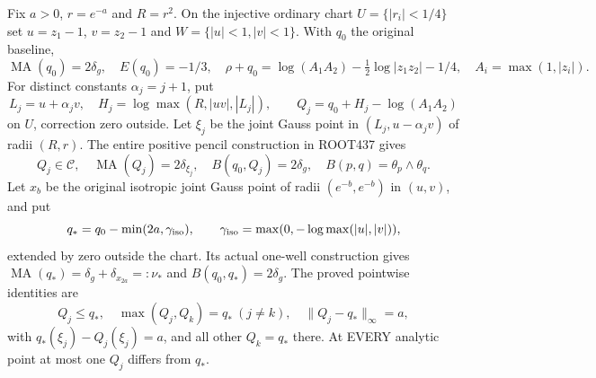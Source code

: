 \documentclass[11pt]{article}
\newcommand{\MA}{\operatorname{MA}}
\newcommand{\C}{\mathcal C}
\begin{document}
Fix $a>0$, $r=e^{-a}$ and $R=r^2$. On the injective ordinary chart
$U=\{|r_i|<1/4\}$ set $u=z_1-1$, $v=z_2-1$ and
$W=\{|u|<1,|v|<1\}$. With $q_0$ the original baseline,
\[
 \MA(q_0)=2\delta_g,\quad E(q_0)=-1/3,\quad
 \rho+q_0=\log(A_1A_2)-\tfrac12\log|z_1z_2|-1/4,
 \quad A_i=\max(1,|z_i|).
\]
For distinct constants $\alpha_j=j+1$, put
\[
 L_j=u+\alpha_jv,\quad H_j=\log\max(R,|uv|,|L_j|),\qquad
 Q_j=q_0+H_j-\log(A_1A_2)
\]
on $U$, correction zero outside. Let $\xi_j$ be the joint Gauss point
in $(L_j,u-\alpha_jv)$ of radii $(R,r)$. The entire positive pencil
construction in ROOT437 gives
\[
 Q_j\in\C,\quad \MA(Q_j)=2\delta_{\xi_j},\quad
 B(q_0,Q_j)=2\delta_g,
 \quad B(p,q)=\theta_p\wedge\theta_q.
\]
Let $x_b$ be the original isotropic joint Gauss point of radii
$(e^{-b},e^{-b})$ in $(u,v)$, and put
\[
 q_*=q_0-\min(2a,\gamma_{\rm iso}),\qquad
 \gamma_{\rm iso}=\max(0,-\log\max(|u|,|v|)),
\]
extended by zero outside the chart. Its actual one-well construction gives
$\MA(q_*)=\delta_g+\delta_{x_{2a}}=:\nu_*$ and $B(q_0,q_*)=2\delta_g$.
The proved pointwise identities are
\[
 Q_j\le q_*,\quad \max(Q_j,Q_k)=q_*\ (j\ne k),\quad
 \|Q_j-q_*\|_\infty=a,
\]
with $q_*(\xi_j)-Q_j(\xi_j)=a$, and all other $Q_k=q_*$ there.
At EVERY analytic point at most one $Q_j$ differs from $q_*$.
\end{document}
